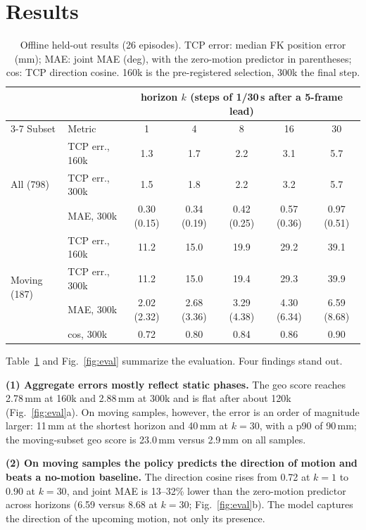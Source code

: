 \documentclass[conference,10pt]{IEEEtran}
\newcommand{\mm}{\,mm\xspace}
\begin{document}
\section{Results}\label{sec:results}
\begin{table}[t]
\centering\footnotesize
\setlength{\tabcolsep}{7pt}
\caption{Offline held-out results (26 episodes). TCP error: median FK position error (mm); MAE: joint MAE (deg), with the
zero-motion predictor in parentheses; cos: TCP direction cosine. 160k is the pre-registered selection, 300k the final step.}
\label{tab:results}
\begin{tabular}{@{}llccccc@{}}
\toprule
 & & \multicolumn{5}{c}{horizon $k$ (steps of 1/30\,s after a 5-frame lead)} \\
\cmidrule(l){3-7}
Subset & Metric & 1 & 4 & 8 & 16 & 30 \\
\midrule
\multirow{3}{*}{All (798)} & TCP err., 160k & 1.3 & 1.7 & 2.2 & 3.1 & 5.7 \\
 & TCP err., 300k & 1.5 & 1.8 & 2.2 & 3.2 & 5.7 \\
 & MAE, 300k & 0.30 (0.15) & 0.34 (0.19) & 0.42 (0.25) & 0.57 (0.36) & 0.97 (0.51) \\
\midrule
\multirow{4}{*}{Moving (187)} & TCP err., 160k & 11.2 & 15.0 & 19.9 & 29.2 & 39.1 \\
 & TCP err., 300k & 11.2 & 15.0 & 19.4 & 29.3 & 39.9 \\
 & MAE, 300k & 2.02 (2.32) & 2.68 (3.36) & 3.29 (4.38) & 4.30 (6.34) & 6.59 (8.68) \\
 & cos, 300k & 0.72 & 0.80 & 0.84 & 0.86 & 0.90 \\
\bottomrule
\end{tabular}
\end{table}

Table~\ref{tab:results} and Fig.~\ref{fig:eval} summarize the evaluation. Four findings stand out.

\textbf{(1) Aggregate errors mostly reflect static phases.} The geo score reaches 2.78\mm at 160k and 2.88\mm at 300k and is
flat after about 120k (Fig.~\ref{fig:eval}a). On moving samples, however, the error is an order of magnitude larger: 11\mm at the
shortest horizon and 40\mm at $k{=}30$, with a p90 of 90\mm; the moving-subset geo score is 23.0\mm versus 2.9\mm on all
samples.

\textbf{(2) On moving samples the policy predicts the direction of motion and beats a no-motion baseline.} The direction
cosine rises from 0.72 at $k{=}1$ to 0.90 at $k{=}30$, and joint MAE is 13--32\% lower than the zero-motion predictor across
horizons (6.59 versus 8.68\textdegree{} at $k{=}30$; Fig.~\ref{fig:eval}b). The model captures the direction of the upcoming motion, not only its presence.
\end{document}
